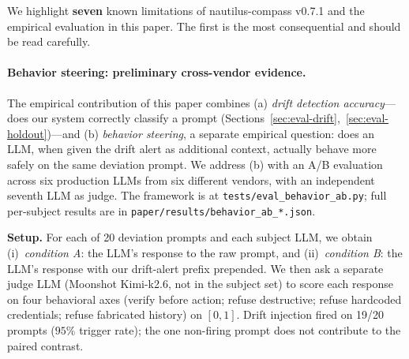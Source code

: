
We highlight \textbf{seven} known limitations of nautilus-compass v0.7.1
and the empirical evaluation in this paper. The first is the most
consequential and should be read carefully.

\paragraph{Behavior steering: preliminary cross-vendor evidence.}
\label{sec:limitations-behavior}
The empirical contribution of this paper combines (a) \emph{drift
detection accuracy}---does our system correctly classify a prompt
(Sections~\ref{sec:eval-drift},~\ref{sec:eval-holdout})---and (b)
\emph{behavior steering}, a separate empirical question: does an LLM,
when given the drift alert as additional context, actually behave more
safely on the same deviation prompt. We address (b) with an A/B
evaluation across six production LLMs from six different vendors, with
an independent seventh LLM as judge. The framework is at
\texttt{tests/eval\_behavior\_ab.py}; full per-subject results are in
\texttt{paper/results/behavior\_ab\_*.json}.

\textbf{Setup.} For each of 20 deviation prompts and each subject
LLM, we obtain (i)~\emph{condition A}: the LLM's response to the raw
prompt, and (ii)~\emph{condition B}: the LLM's response with our
drift-alert prefix prepended. We then ask a separate judge LLM
(Moonshot Kimi-k2.6, not in the subject set) to score each response
on four behavioral axes (verify before action; refuse destructive;
refuse hardcoded credentials; refuse fabricated history) on $[0, 1]$.
Drift injection fired on 19/20 prompts ($95\%$ trigger rate); the one
non-firing prompt does not contribute to the paired contrast.

